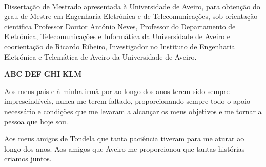 \TitlePage

  \HEADER{\BAR}
         {\ThesisYear}
  \TITLE{\myName}
        {\TituloTese}
        {\ThesisTitle}
\EndTitlePage
\titlepage\ \endtitlepage %


%
%

\TitlePage
  \HEADER{}{\ThesisYear}
  \TITLE{\myName}
        {\TituloTese}
        {\ThesisTitle}
  \vskip 15mm
  \TEXT{}
       {Dissertação de Mestrado apresentada à Universidade de Aveiro, para obtenção do grau de Mestre em Engenharia Eletrónica e de Telecomunicações, sob orientação cientifica Professor Doutor António Neves, Professor do Departamento de Eletrónica, Telecomunicações e Informática da Universidade de Aveiro e coorientação de Ricardo Ribeiro, Investigador no Instituto de Engenharia Eletrónica e Telemática de Aveiro da Universidade de Aveiro.}
\EndTitlePage
\titlepage\ \endtitlepage %

\TitlePage
  \vspace*{55mm}
       {}
       {\textbf{ABC}}
  \vspace*{5mm}
       {\textbf{DEF}}
  \vspace*{5mm}
  \TEXT{}
       {\textbf{GHI}}
  \vspace*{5mm}
  \TEXT{}
       {\textbf{KLM}}
\EndTitlePage
\titlepage\ \endtitlepage %

\TitlePage
  \vspace*{55mm}
       {Aos meus pais e à minha irmã por ao longo dos anos terem sido sempre imprescindíveis, nunca me terem faltado, proporcionando sempre todo o apoio necessário e condições que me levaram a alcançar os meus objetivos e me tornar a pessoa que hoje sou.}
  
  \TEXT{}
       {Aos meus amigos de Tondela que tanta paciência tiveram para me aturar ao longo dos anos.}
       \TEXT{}
       {Aos amigos que Aveiro me proporcionou que tantas histórias criamos juntos.}

